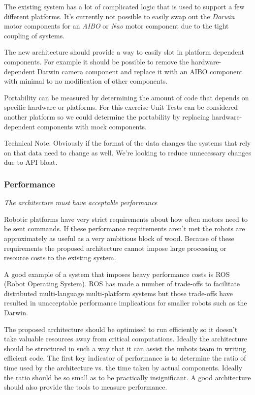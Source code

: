\documentclass[english,12pt]{scrartcl}
\newcommand{\requirement}[1]{\textit{#1}}
\begin{document}
				The existing system has a lot of complicated logic that is used to support a few
				different platforms. It's currently not possible to easily swap out the \emph{Darwin} motor
				components for an \emph{AIBO} or \emph{Nao} motor component due to the tight coupling of systems.
	
				The new architecture should provide a way to easily slot in platform dependent
				components. For example it should be possible to remove the hardware-dependent Darwin
				camera component and replace it with an AIBO component with minimal to no modification
				of other components.
	
				Portability can be measured by determining the amount of code that depends on specific
				hardware or platforms. For this exercise Unit Tests can be considered another platform
				so we could determine the portability by replacing hardware-dependent components with
				mock components.
	
				Technical Note: Obviously if the format of the data changes the systems that rely on
				that data need to change as well. We're looking to reduce unnecessary changes due to API
				bloat.

			\subsubsection{Performance}
				\requirement{The architecture must have acceptable performance}
	
				Robotic platforms have very strict requirements about how often motors need to be sent
				commands. If these performance requirements aren't met the robots are approximately as
				useful as a very ambitious block of wood. Because of these requirements the proposed
				architecture cannot impose large processing or resource costs to the existing system.
	
				A good example of a system that imposes heavy performance costs is ROS (Robot Operating
				System). ROS has made a number of trade-offs to facilitate distributed multi-language
				multi-platform systems but those trade-offs have resulted in unacceptable performance
				implications for smaller robots such as the Darwin.
	
				The proposed architecture should be optimised to run efficiently so it doesn't take
				valuable resources away from critical computations. Ideally the architecture should be
				structured in such a way that it can assist the \gls{nubots} team in writing efficient code.
				The first key indicator of performance is to determine the ratio of time used by the
				architecture vs. the time taken by actual components. Ideally the ratio should be so
				small as to be practically insignificant. A good architecture should also provide the
				tools to measure performance.
	
\end{document}
